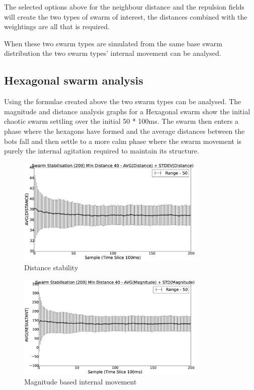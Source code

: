 \documentclass[10pt,journal,letterpaper,twoside]{IEEEtran}
\newcommand{\swarmA}{Hexagonal}
\newcommand{\stability}{internal movement}
\begin{document}
The selected options above for the neighbour distance and the
repulsion fields will create the two types of swarm of interest, the
distances combined with the weightings are all that is required.

When these two swarm types are simulated from the same base swarm
distribution the two swarm types' \stability{} can be analysed.


\subsection{\swarmA{} swarm analysis}

Using the formulae created above the two swarm types can be
analysed. The magnitude and distance analysis graphs for a \swarmA{}
swarm show the initial chaotic swarm settling over the initial 50 *
100ms. The swarm then enters a phase where the hexagons have formed
and the average distances between the bots fall and then settle to a
more calm phase where the swarm movement is purely the internal
agitation required to maintain its structure.

\begin{figure}[H]
\begin{center}
\includegraphics[width=9cm]{figures/StabilityDistanceSwarm40-50}
\end{center}
\caption{Distance stability\label{methods:StabilityDistanceSwarm40-50}}
\end{figure}

\begin{figure}[H]
\begin{center}
\includegraphics[width=9cm]{figures/StabilityMagnitudeSwarm40-50}
\end{center}
\caption{Magnitude based \stability{}\label{methods:StabilityMagnitudeSwarm40-50}}
\end{figure}
\end{document}
